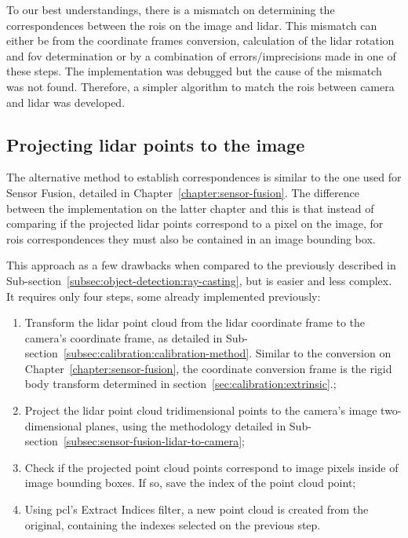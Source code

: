 To our best understandings, there is a mismatch on determining the correspondences between the \acp{roi} on the image and \ac{lidar}. This mismatch can either be from the coordinate frames conversion, calculation of the \ac{lidar} rotation and \ac{fov} determination or by a combination of errors/imprecisions made in one of these steps. The implementation was debugged but the cause of the mismatch was not found. Therefore, a simpler algorithm to match the \acp{roi} between camera and \ac{lidar} was developed. 


\subsection{Projecting \ac{lidar} points to the image}
\label{subsec:object-detection:projection-correspondences}

The alternative method to establish correspondences is similar to the one used for Sensor Fusion, detailed in Chapter~\ref{chapter:sensor-fusion}. The difference between the implementation on the latter chapter and this is that instead of comparing if the projected \ac{lidar} points correspond to a pixel on the image, for \acp{roi} correspondences they must also be contained in an image bounding box. 

This approach as a few drawbacks when compared to the previously described in Sub-section~\ref{subsec:object-detection:ray-casting}, but is easier and less complex. It requires only four steps, some already implemented previously:

\begin{enumerate}
	\item Transform the \ac{lidar} point cloud from the \ac{lidar} coordinate frame to the camera's coordinate frame, as detailed in Sub-section~\ref{subsec:calibration:calibration-method}. Similar to the conversion on Chapter~\ref{chapter:sensor-fusion}, the coordinate conversion frame is the rigid body transform determined in section~\ref{sec:calibration:extrinsic}.;
	\item Project the \ac{lidar} point cloud tridimensional points to the camera's image two-dimensional planes, using the methodology detailed in Sub-section~\ref{subsec:sensor-fusion-lidar-to-camera};
	\item Check if the projected point cloud points correspond to image pixels inside of image bounding boxes. If so, save the index of the point cloud point;
	\item Using \ac{pcl}'s Extract Indices filter, a new point cloud is created from the original, containing the indexes selected on the previous step.
\end{enumerate}

